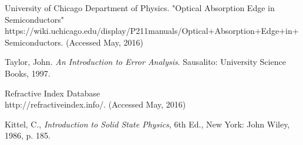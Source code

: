 \documentclass{article}
\begin{document}
\begin{thebibliography}{10}

		University of Chicago Department of Physics. "Optical Absorption Edge in Semiconductors"\\
		https://wiki.uchicago.edu/display/P211manuals/Optical+Absorption+Edge+in+Semiconductors. (Accessed May, 2016)

		Taylor, John. \emph{An Introduction to Error Analysis}. Sausalito: University Science Books, 1997.
		
		Refractive Index Database\\
		http://refractiveindex.info/. (Accessed May, 2016)
		
		Kittel, C., \emph{Introduction to Solid State Physics}, 6th Ed., New York: John Wiley, 1986, p. 185.
		
\end{thebibliography}
\end{document}
